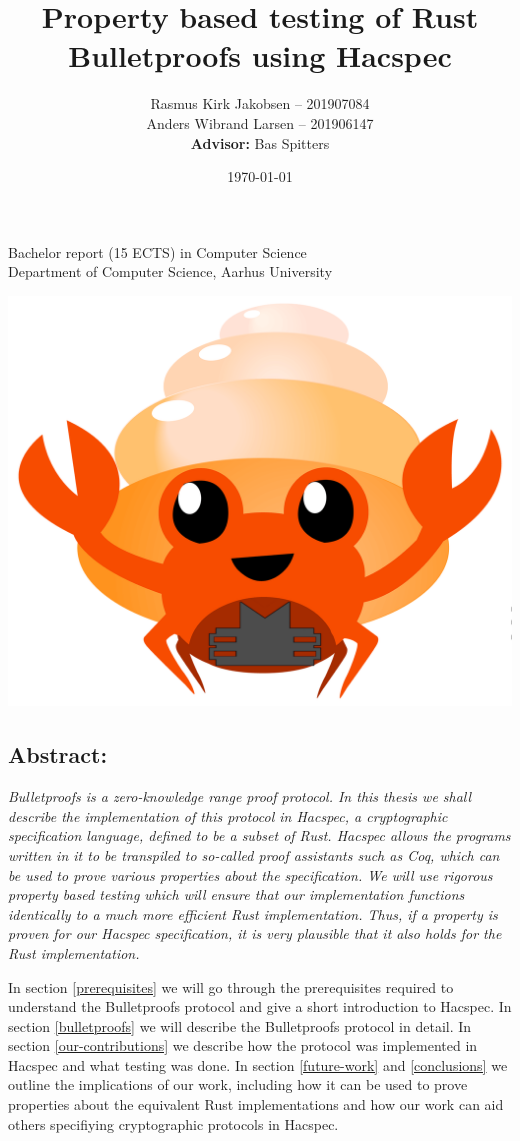 \documentclass{article}
\title{Property based testing of Rust Bulletproofs using Hacspec}
\author{ 
Rasmus Kirk Jakobsen -- 201907084\\
Anders Wibrand Larsen -- 201906147\\
\textbf{Advisor:} Bas Spitters
}
\date{\today}
\begin{document}
\maketitle

\begin{center}
    Bachelor report (15 ECTS) in Computer Science\\
Department of Computer Science, Aarhus University\\
\end{center} 

\begin{center}
	\includegraphics[scale=0.4]{img/bulletproof-hacspec-2.png}
\end{center} 

\subsection*{Abstract:}

{\itshape
	Bulletproofs is a zero-knowledge range proof protocol. In this
	thesis we shall describe the implementation of this protocol
	in Hacspec, a cryptographic specification language,	defined to 
	be a subset of Rust. Hacspec allows the programs
	written in it to be transpiled to so-called proof assistants
	such as Coq, which can be used to prove various properties
	about the specification. We will use rigorous property based
	testing which will ensure that our implementation functions
	identically to a much more efficient Rust implementation. Thus,
	if a property is proven for our Hacspec specification, it is
	very plausible that it also holds for the Rust implementation.

	In section \ref{prerequisites} we will go through the
	prerequisites required to understand the Bulletproofs
	protocol and give a short introduction to Hacspec. In section
	\ref{bulletproofs} we will describe the Bulletproofs protocol in
	detail. In section \ref{our-contributions} we describe how
	the protocol was implemented in Hacspec and what testing was
	done. In section \ref{future-work} and \ref{conclusions}
	we outline the implications of our work, including how it
	can be used to prove properties about the equivalent Rust
	implementations and how our work can aid others specifiying
	cryptographic protocols in Hacspec.
}
\end{document}

